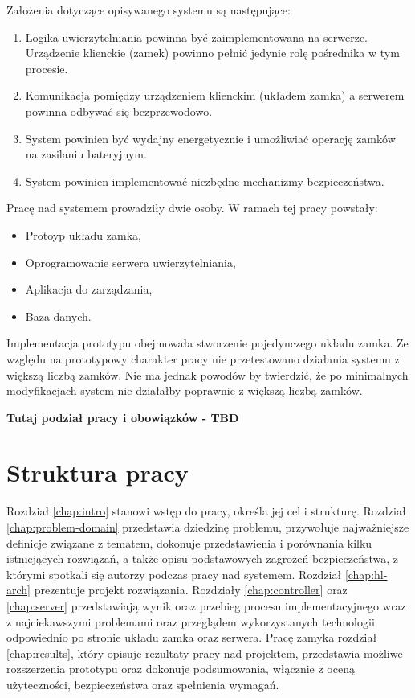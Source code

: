 		Założenia dotyczące opisywanego systemu są następujące:

		\begin{enumerate}
		    \item Logika uwierzytelniania powinna być zaimplementowana na serwerze. Urządzenie klienckie (zamek) powinno pełnić jedynie rolę pośrednika w tym procesie.
		    \item Komunikacja pomiędzy urządzeniem klienckim (układem zamka) a serwerem powinna odbywać się bezprzewodowo.
		    \item System powinien być wydajny energetycznie i umożliwiać operację zamków na zasilaniu bateryjnym.
		    \item System powinien implementować niezbędne mechanizmy bezpieczeństwa.
		\end{enumerate}

		Pracę nad systemem prowadziły dwie osoby. W ramach tej pracy powstały:
		\begin{itemize}
		    \item Protoyp układu zamka,
		    \item Oprogramowanie serwera uwierzytelniania,
		    \item Aplikacja do zarządzania,
		    \item Baza danych.
		\end{itemize}

		Implementacja prototypu obejmowała stworzenie pojedynczego układu zamka. Ze względu na prototypowy charakter pracy nie przetestowano działania systemu z większą liczbą zamków. Nie ma jednak powodów by twierdzić, że po minimalnych modyfikacjach system nie działałby poprawnie z większą liczbą zamków.

		\textbf{Tutaj podział pracy i obowiązków - TBD}

	\section{Struktura pracy}

		Rozdział \ref{chap:intro} stanowi wstęp do pracy, określa jej cel i strukturę. Rozdział \ref{chap:problem-domain} przedstawia dziedzinę problemu, przywołuje najważniejsze definicje związane z tematem, dokonuje przedstawienia i porównania kilku istniejących rozwiązań, a także opisu podstawowych zagrożeń bezpieczeństwa, z którymi spotkali się autorzy podczas pracy nad systemem. Rozdział \ref{chap:hl-arch} prezentuje projekt rozwiązania. Rozdziały \ref{chap:controller} oraz \ref{chap:server} przedstawiają wynik oraz przebieg procesu implementacyjnego wraz z najciekawszymi problemami oraz przeglądem wykorzystanych technologii odpowiednio po stronie układu zamka oraz serwera. Pracę zamyka rozdział \ref{chap:results}, który opisuje rezultaty pracy nad projektem, przedstawia możliwe rozszerzenia prototypu oraz dokonuje podsumowania, włącznie z oceną użyteczności, bezpieczeństwa oraz spełnienia wymagań.